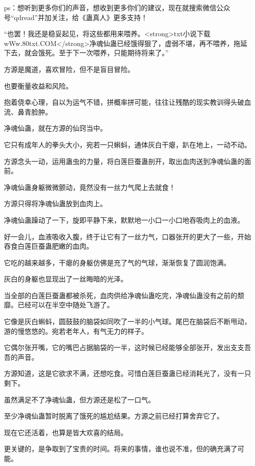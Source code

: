 
\begin{this_body}

ps：想听到更多你们的声音，想收到更多你们的建议，现在就搜索微信公众号“qdread”并加关注，给《蛊真人》更多支持！

“也罢！我还是稳妥起见，将这些都用来喂养。<strong>txt小说下载wWw.80txt.COM</strong>净魂仙蛊已经饿得狠了，虚弱不堪，再不喂养，拖延下去，就会饿死。至于下一次喂养，只能期待将来了。”

方源是魔道，喜欢冒险，但不是盲目冒险。

也要衡量收益和风险。

抱着侥幸心理，自以为运气不错，拼概率拼可能，往往让残酷的现实教训得头破血流、鼻青脸肿。

净魂仙蛊，就在方源的仙窍当中。

它只有成年人的拳头大小，宛若一只蝌蚪，通体灰白干瘪，趴在地上，一动不动。

方源念头一动，运用蛊虫的力量，将白莲巨蚕蛊剖开，取出血肉送到净魂仙蛊的面前。

净魂仙蛊身躯微微颤动，竟然没有一丝力气爬上去就食！

方源只得将净魂仙蛊放到血肉上。

净魂仙蛊躁动了一下，旋即平静下来，默默地一小口一小口地吞吸肉上的血液。

好一会儿，血液吸收入腹，终于让它有了一丝力气，口器张开的更大了一些，开始吞食白莲巨蚕蛊肥嫩的血肉。

它吃的越来越多，干瘪的身躯仿佛是充了气的气球，渐渐恢复了圆润饱满。

灰白的身躯也显现出了一丝晦暗的光泽。

当全部的白莲巨蚕蛊都被杀死，血肉供给净魂仙蛊吃完，净魂仙蛊没有之前的颓靡。已经可以在半空中随处飞游了。

它像是灰白蝌蚪，圆鼓鼓的脑袋如同吹了一半的小气球。尾巴在脑袋后不断甩动，游的慢悠悠的。宛若老年人，有气无力的样子。

它偶尔张开嘴，它的嘴巴占据脑袋的一半，这时候已经能够全部张开，发出支支吾吾的声音。

方源知道，这是它欲求不满，还想吃食。可惜白莲巨蚕蛊已经消耗光了，没有一只剩下。

虽然满足不了净魂仙蛊，但方源还是松了一口气。

至少净魂仙蛊暂时脱离了饿死的尴尬结果。方源之前已经打算舍弃它了。

现在它还活着，也算是皆大欢喜的结局。

更关键的，是争取到了宝贵的时间。将来的事情，谁也说不准，但的确充满了可能。


\end{this_body}
